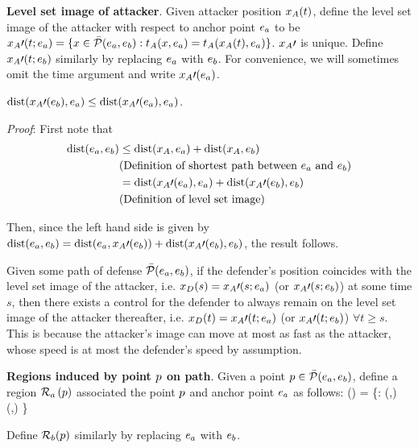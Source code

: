 \begin{defn} %
\textbf{Level set image of attacker}. Given attacker position $x_A(t)$, define the level set image of the attacker with respect to anchor point $e_a$ to be $x_A\prime(t;e_a) = \{x\in\bar{\mathcal{P}}(e_a,e_b): t_A(x,e_a) = t_A(x_A(t),e_a)\}$. $x_A\prime$ is unique. Define $x_A\prime(t;e_b)$ similarly by replacing $e_a$ with $e_b$. For convenience, we will sometimes omit the time argument and write $x_A\prime(e_a)$.
\end{defn}

\begin{rem}
\label{rem:image_of_a}
$\text{dist}(x_A\prime(e_b),e_a) \le \text{dist}(x_A\prime(e_a),e_a)$. 

\textit{Proof}:
First note that
\begin{equation*}
\begin{aligned}
\text{dist}(e_a,e_b) &\le \text{dist}(x_A,e_a) + \text{dist}(x_A,e_b)\\
& \text{(Definition of shortest path between $e_a$ and $e_b$)} \\
& = \text{dist}(x_A\prime(e_a),e_a) + \text{dist}(x_A\prime(e_b),e_b) \\
& \text{(Definition of level set image)}
\end{aligned}
\end{equation*}

Then, since the left hand side is given by $\text{dist}(e_a,e_b) = \text{dist}(e_a,x_A\prime(e_b))+\text{dist}(x_A\prime(e_b),e_b)$, the result follows.
\end{rem}

\begin{rem}
Given some path of defense $\bar{\mathcal{P}}(e_a,e_b)$, if the defender's position coincides with the level set image of the attacker, i.e. $x_D(s) = x_A\prime(s;e_a)$ (or $x_A\prime(s;e_b)$) at some time $s$, then there exists a control for the defender to always remain on the level set image of the attacker thereafter, i.e. $x_D(t) = x_A\prime(t;e_a)$ (or $x_A\prime(t;e_b)$) $\forall t\ge s$. This is because the attacker's image can move at most as fast as the attacker, whose speed is at most the defender's speed by assumption.
\end{rem}

\begin{defn} %
\label{def:d_win_region}
\textbf{Regions induced by point $p$ on path}. Given a point $p\in\bar{\mathcal{P}}(e_a,e_b)$, define a region $\mathcal{R}_a\left(p\right)$ associated the point $p$ and anchor point $e_a$ as follows:
\bq
\rpa\left(\ppath\right) = \left\{\x: \dist(\x,\apa) \leq \dist(\ppath,\apa) \right\}
\eq

Define $\mathcal{R}_b(p)$ similarly by replacing $e_a$ with $e_b$.
\end{defn}


